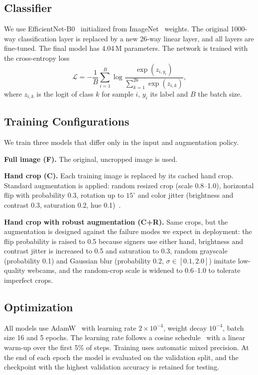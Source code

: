 \documentclass[conference]{IEEEtran}
\begin{document}
\subsection{Classifier}
We use EfficientNet-B0~\cite{tan2019efficientnet} initialized from ImageNet~\cite{deng2009imagenet} weights. The original 1000-way classification layer is replaced by a new 26-way linear layer, and all layers are fine-tuned. The final model has 4.04\,M parameters. The network is trained with the cross-entropy loss
\begin{equation}
\mathcal{L} = -\frac{1}{B}\sum_{i=1}^{B}\log \frac{\exp(z_{i,y_i})}{\sum_{k=1}^{26}\exp(z_{i,k})},
\end{equation}
where $z_{i,k}$ is the logit of class $k$ for sample $i$, $y_i$ its label and $B$ the batch size.

\subsection{Training Configurations}
We train three models that differ only in the input and augmentation policy.

\textbf{Full image (F).} The original, uncropped image is used.

\textbf{Hand crop (C).} Each training image is replaced by its cached hand crop. Standard augmentation is applied: random resized crop (scale 0.8--1.0), horizontal flip with probability 0.3, rotation up to $15^\circ$ and color jitter (brightness and contrast 0.3, saturation 0.2, hue 0.1)~\cite{shorten2019survey}.

\textbf{Hand crop with robust augmentation (C+R).} Same crops, but the augmentation is designed against the failure modes we expect in deployment: the flip probability is raised to 0.5 because signers use either hand, brightness and contrast jitter is increased to 0.5 and saturation to 0.3, random grayscale (probability 0.1) and Gaussian blur (probability 0.2, $\sigma\in[0.1,2.0]$) imitate low-quality webcams, and the random-crop scale is widened to 0.6--1.0 to tolerate imperfect crops.

\subsection{Optimization}
All models use AdamW~\cite{loshchilov2019decoupled} with learning rate $2\times10^{-4}$, weight decay $10^{-4}$, batch size 16 and 5 epochs. The learning rate follows a cosine schedule~\cite{loshchilov2017sgdr} with a linear warm-up over the first 5\% of steps. Training uses automatic mixed precision. At the end of each epoch the model is evaluated on the validation split, and the checkpoint with the highest validation accuracy is retained for testing.
\end{document}
